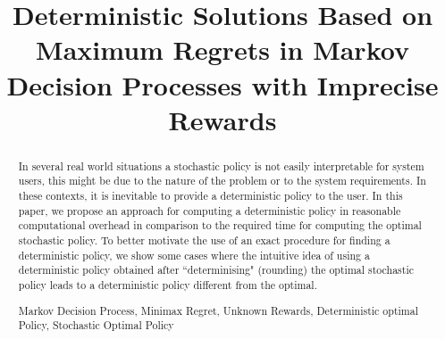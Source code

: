\documentclass[runningheads,a4paper]{llncs}
\newcommand{\up}[1]{\textsuperscript{#1}}
\newcommand{\keywords}[1]{\par\addvspace\baselineskip
\noindent\keywordname\enspace\ignorespaces#1}
\begin{document}
\mainmatter  %

\title{Deterministic Solutions Based on Maximum Regrets in Markov Decision Processes with Imprecise Rewards}


%
%


%



%
%

\maketitle


\begin{abstract}
In several real world situations a stochastic policy is not easily interpretable for system users, this might be due to the nature of the problem or to the system requirements. In these contexts, it is inevitable to provide a deterministic policy to the user. In this paper, we propose an approach for computing a deterministic policy in reasonable computational overhead in comparison to the required time for computing the optimal stochastic policy. To better motivate the use of an exact procedure for finding a deterministic policy, we show some cases where the intuitive idea of using a deterministic policy obtained after ``determinising" (rounding) the optimal stochastic policy leads to a deterministic policy different from the optimal.

\keywords{Markov Decision Process, Minimax Regret, Unknown Rewards, Deterministic optimal Policy, Stochastic Optimal Policy}
\end{abstract}
\end{document}
